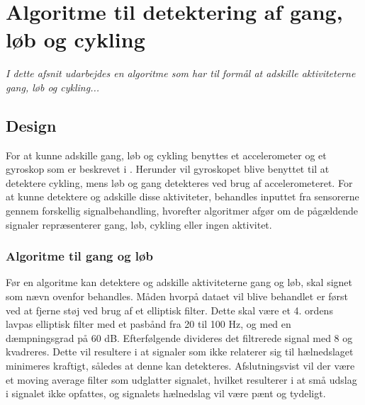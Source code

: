 \section{Algoritme til detektering af gang, løb og cykling}
\textit{I dette afsnit udarbejdes en algoritme som har til formål at adskille aktiviteterne gang, løb og cykling... }

\subsection{Design}

For at kunne adskille gang, løb og cykling benyttes et accelerometer og et gyroskop som er beskrevet i . Herunder vil gyroskopet blive benyttet til at detektere cykling, mens løb og gang detekteres ved brug af accelerometeret. For at kunne detektere og adskille disse aktiviteter, behandles inputtet fra sensorerne gennem forskellig signalbehandling, hvorefter algoritmer afgør om de pågældende signaler repræsenterer gang, løb, cykling eller ingen aktivitet. 

\subsubsection{Algoritme til gang og løb}

Før en algoritme kan detektere og adskille aktiviteterne gang og løb, skal signet som nævn ovenfor behandles. Måden hvorpå dataet vil blive behandlet er først ved at fjerne støj ved brug af et elliptisk filter. Dette skal være et 4. ordens lavpas elliptisk filter med et pasbånd fra 20 til 100 Hz, og med en dæmpningsgrad på 60 dB. Efterfølgende divideres det filtrerede signal med 8 og kvadreres. Dette vil resultere i at signaler som ikke relaterer sig til hælnedslaget minimeres kraftigt, således at denne kan detekteres.
Afslutningsvist vil der være et moving average filter som udglatter signalet, hvilket resulterer i at små udslag i signalet ikke opfattes, og signalets hælnedslag vil være pænt og tydeligt. 

